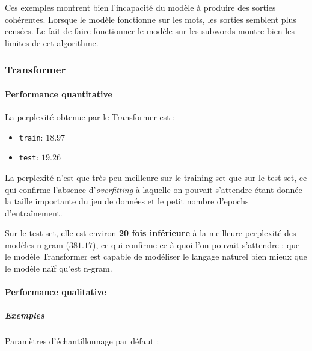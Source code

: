 Ces exemples montrent bien l'incapacité du modèle à produire des sorties
cohérentes. Lorsque le modèle fonctionne sur les mots, les sorties
semblent plus censées. Le fait de faire fonctionner le modèle sur les
subwords montre bien les limites de cet algorithme.

\hypertarget{transformer}{%
\subsubsection{Transformer}\label{transformer}}

\hypertarget{performance-quantitative-1}{%
\paragraph{Performance quantitative}\label{performance-quantitative-1}}

La perplexité obtenue par le Transformer est :

\begin{itemize}
\tightlist
\item
  \texttt{train}: \(18.97\)
\item
  \texttt{test}: \(19.26\)
\end{itemize}

La perplexité n'est que très peu meilleure sur le training set que sur
le test set, ce qui confirme l'absence d'\emph{overfitting} à laquelle
on pouvait s'attendre étant donnée la taille importante du jeu de
données et le petit nombre d'epochs d'entraînement.

Sur le test set, elle est environ \textbf{20 fois inférieure} à la
meilleure perplexité des modèles n-gram (\(381.17\)), ce qui confirme ce
à quoi l'on pouvait s'attendre : que le modèle Transformer est capable
de modéliser le langage naturel bien mieux que le modèle naïf qu'est
n-gram.

\hypertarget{performance-qualitative-1}{%
\paragraph{Performance qualitative}\label{performance-qualitative-1}}

\hypertarget{exemples}{%
\subparagraph{Exemples}\label{exemples}}

Paramètres d'échantillonnage par défaut :

